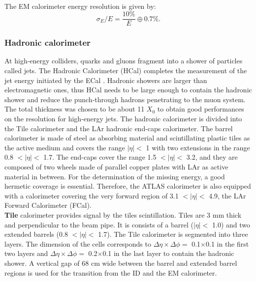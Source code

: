 \\
The EM calorimeter energy resolution is given by:
\begin{equation}
    \sigma_E/E = \frac{10\%}{E} \oplus 0.7\%.
\end{equation}

\subsubsection{Hadronic calorimeter}
\label{chap2:ATLAS:Calo:HCAL}
 At high-energy colliders, quarks and gluons fragment into a shower of particles called jets. The Hadronic Calorimeter (HCal) completes the measurement of the jet energy initiated by the ECal \cite{Tile_TDR}. Hadronic showers are larger than electromagnetic ones, thus HCal needs to be large enough to contain the hadronic shower and reduce the punch-through hadrons penetrating to the muon system. The total thickness was chosen to be about 11 $X_0$ to obtain good performances on the resolution for high-energy jets. The hadronic calorimeter is divided into the Tile calorimeter and the LAr hadronic end-caps calorimeter. The barrel calorimeter is made of steel as absorbing material and scintillating plastic tiles as the active medium and covers the range $|\eta| < $ 1 with two extensions in the range 0.8 $ < |\eta| < $ 1.7. The end-caps cover the range 1.5 $ < |\eta| < $ 3.2, and they are composed of two wheels made of parallel copper plates with LAr as active material in between. For the determination of the missing energy, a good hermetic coverage is essential. Therefore, the ATLAS calorimeter is also equipped with a calorimeter covering the very forward region of 3.1 $ < |\eta| < $ 4.9, the LAr Forward Calorimeter (FCal). \\
 
\textbf{Tile} calorimeter provides signal by the tiles scintillation. Tiles are 3 mm thick and perpendicular to the beam pipe. It is consists of a barrel ($|\eta| < $ 1.0) and two extended barrels (0.8 $ < |\eta| < $ 1.7). The Tile calorimeter is segmented into three layers. The dimension of the cells corresponds to $\Delta\eta\times\Delta\phi=$ 0.1$\times$0.1 in the first two layers and $\Delta\eta\times\Delta\phi=$ 0.2$\times$0.1 in the last layer to contain the hadronic shower. A vertical gap of 68 cm wide between the barrel and extended barrel regions is used for the transition from the ID and the EM calorimeter. \\
 
